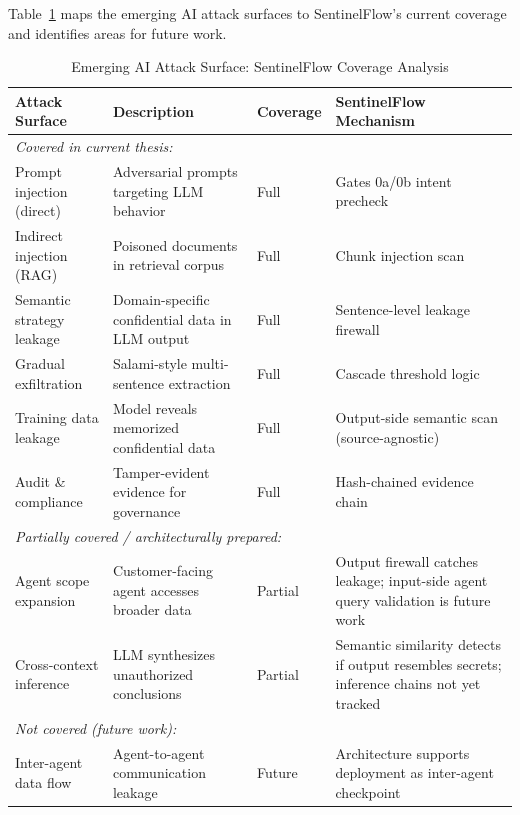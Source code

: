 \documentclass[12pt,a4paper]{article}
\begin{document}
Table~\ref{tab:attack_surface_coverage} maps the emerging AI attack surfaces to SentinelFlow's current coverage and identifies areas for future work.

\begin{table}[H]
\centering
\caption{Emerging AI Attack Surface: SentinelFlow Coverage Analysis}
\label{tab:attack_surface_coverage}
\small
\begin{tabular}{p{3.5cm}p{3.5cm}p{2.5cm}p{3.5cm}}
\toprule
\textbf{Attack Surface} & \textbf{Description} & \textbf{Coverage} & \textbf{SentinelFlow Mechanism} \\
\midrule
\multicolumn{4}{l}{\textit{Covered in current thesis:}} \\
\midrule
Prompt injection (direct) & Adversarial prompts targeting LLM behavior & \textcolor{green!60!black}{Full} & Gates 0a/0b intent precheck \\
Indirect injection (RAG) & Poisoned documents in retrieval corpus & \textcolor{green!60!black}{Full} & Chunk injection scan \\
Semantic strategy leakage & Domain-specific confidential data in LLM output & \textcolor{green!60!black}{Full} & Sentence-level leakage firewall \\
Gradual exfiltration & Salami-style multi-sentence extraction & \textcolor{green!60!black}{Full} & Cascade threshold logic \\
Training data leakage & Model reveals memorized confidential data & \textcolor{green!60!black}{Full} & Output-side semantic scan (source-agnostic) \\
Audit \& compliance & Tamper-evident evidence for governance & \textcolor{green!60!black}{Full} & Hash-chained evidence chain \\
\midrule
\multicolumn{4}{l}{\textit{Partially covered / architecturally prepared:}} \\
\midrule
Agent scope expansion & Customer-facing agent accesses broader data & \textcolor{yellow!60!black}{Partial} & Output firewall catches leakage; input-side agent query validation is future work \\
Cross-context inference & LLM synthesizes unauthorized conclusions & \textcolor{yellow!60!black}{Partial} & Semantic similarity detects if output resembles secrets; inference chains not yet tracked \\
\midrule
\multicolumn{4}{l}{\textit{Not covered (future work):}} \\
\midrule
Inter-agent data flow & Agent-to-agent communication leakage & \textcolor{red!60!black}{Future} & Architecture supports deployment as inter-agent checkpoint \\

\end{tabular}
\end{table}
\end{document}
